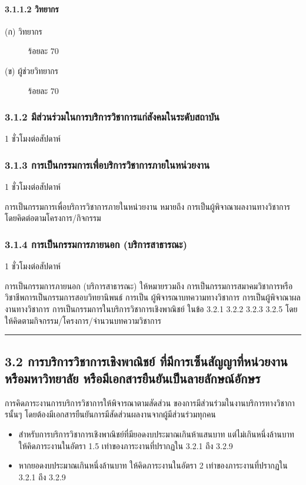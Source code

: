 \documentclass[a4paper,12pt,english]{sphinxmanual}
\begin{document}
\paragraph{3.1.1.2 วิทยากร}
\label{\detokenize{workload_rubric:id58}}\begin{description}
\item[{(ก) วิทยากร}] \leavevmode
ร้อยละ 70

\item[{(ข) ผู้ช่วยวิทยากร}] \leavevmode
ร้อยละ 70

\end{description}


\subsubsection{3.1.2 มีส่วนร่วมในการบริการวิชาการแก่สังคมในระดับสถาบัน}
\label{\detokenize{workload_rubric:id59}}
1 ชั่วโมงต่อสัปดาห์


\subsubsection{3.1.3 การเป็นกรรมการเพื่อบริการวิชาการภายในหน่วยงาน}
\label{\detokenize{workload_rubric:id60}}
1 ชั่วโมงต่อสัปดาห์

การเป็นกรรมการเพื่อบริการวิชาการภายในหน่วยงาน หมายถึง การเป็นผู้พิจาณาผลงานทางวิชาการ โดยคิดต่อตามโครงการ/กิจกรรม


\subsubsection{3.1.4 การเป็นกรรมการภายนอก (บริการสาธารณะ)}
\label{\detokenize{workload_rubric:id61}}
1 ชั่วโมงต่อสัปดาห์

การเป็นกรรมการภายนอก (บริการสาธารณะ) ให้หมายรวมถึง การเป็นกรรมการสมาคมวิชาการหรือวิชาชีพการเป็นกรรมการสอบวิทยานิพนธ์ การเป็น
ผู้พิจารณาบทความทางวิชาการ การเป็นผู้พิจาณาผลงานทางวิชาการ การเป็นกรรมการในบริการวิชาการเชิงพาณิชย์ ในข้อ 3.2.1 3.2.2 3.2.3 3.2.5
โดยให้คิดตามกิจกรรม/โครงการ/จำนวนบทความวิชาการ


\bigskip\hrule\bigskip



\subsection{3.2 การบริการวิชาการเชิงพาณิชย์ ที่มีการเซ็นสัญญาที่หน่วยงาน หรือมหาวิทยาลัย หรือมีเอกสารยืนยันเป็นลายลักษณ์อักษร}
\label{\detokenize{workload_rubric:id62}}
การคิดภาระงานการบริการวิชาการให้พิจารณาตามสัดส่วน ของการมีส่วนร่วมในงานบริการทางวิชาการนั้นๆ โดยต้องมีเอกสารยืนยันการมีสัดส่วนผลงานจากผู้มีส่วนร่วมทุกคน
\begin{itemize}
\item {} 
สำหรับการบริการวิชาการเชิงพาณิชย์ที่มียอดงบประมาณเกินห้าแสนบาท แต่ไม่เกินหนึ่งล้านบาท ให้คิดภาระงานในอัตรา 1.5 เท่าของภาระงานที่ปรากฏใน 3.2.1 ถึง 3.2.9

\item {} 
หากยอดงบประมาณเกินหนึ่งล้านบาท ให้คิดภาระงานในอัตรา 2 เท่าของภาระงานที่ปรากฏใน 3.2.1 ถึง 3.2.9

\end{itemize}
\end{document}
